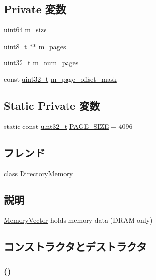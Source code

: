 \subsection*{Private 変数}
\begin{DoxyCompactItemize}
\item 
\hyperlink{TypeDefines_8hh_a29940ae63ec06c9998bba873e25407ad}{uint64} \hyperlink{classMemoryVector_ac0071dd217f86f00bbd71d9d0d4eb257}{m\_\-size}
\item 
uint8\_\-t $\ast$$\ast$ \hyperlink{classMemoryVector_a80e2fa6a21a7254c7956f4956a151faa}{m\_\-pages}
\item 
\hyperlink{Type_8hh_a435d1572bf3f880d55459d9805097f62}{uint32\_\-t} \hyperlink{classMemoryVector_a388f518731020bfb575b5e4e6267fc5a}{m\_\-num\_\-pages}
\item 
const \hyperlink{Type_8hh_a435d1572bf3f880d55459d9805097f62}{uint32\_\-t} \hyperlink{classMemoryVector_a0db9bff4ff55b605292f796dd7aae285}{m\_\-page\_\-offset\_\-mask}
\end{DoxyCompactItemize}
\subsection*{Static Private 変数}
\begin{DoxyCompactItemize}
\item 
static const \hyperlink{Type_8hh_a435d1572bf3f880d55459d9805097f62}{uint32\_\-t} \hyperlink{classMemoryVector_adece9379840adc8842e99cea5f24e4f2}{PAGE\_\-SIZE} = 4096
\end{DoxyCompactItemize}
\subsection*{フレンド}
\begin{DoxyCompactItemize}
\item 
class \hyperlink{classMemoryVector_a40907c9241cfbaf58daf0c9c7a4a9edd}{DirectoryMemory}
\end{DoxyCompactItemize}


\subsection{説明}
\hyperlink{classMemoryVector}{MemoryVector} holds memory data (DRAM only) 

\subsection{コンストラクタとデストラクタ}
\hypertarget{classMemoryVector_a0d69cc0d03dd90dec0a42a02f80e6fc3}{
\subsubsection[{MemoryVector}]{ ()}}
\label{classMemoryVector_a0d69cc0d03dd90dec0a42a02f80e6fc3}



